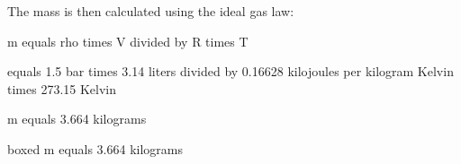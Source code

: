 The mass is then calculated using the ideal gas law:

m equals rho times V divided by R times T

equals 1.5 bar times 3.14 liters divided by 0.16628 kilojoules per kilogram Kelvin times 273.15 Kelvin

m equals 3.664 kilograms

boxed m equals 3.664 kilograms